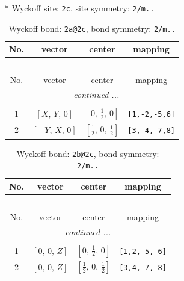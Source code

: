 \documentclass[fleqn,8pt]{jsarticle}
\begin{document}
* Wyckoff site: {\tt 2c}, site symmetry: {\tt 2/m..}
\renewcommand{\arraystretch}{1.2}
\begin{longtable}{cccc}
\caption{Wyckoff bond: {\tt 2a@2c}, bond symmetry: {\tt 2/m..}}
 \\
 \hline \hline
No. & vector & center & mapping \\ \hline \endfirsthead

\multicolumn{3}{l}{\tablename\ \thetable{}} \\
 \hline \hline
No. & vector & center & mapping \\ \hline \endhead

 \hline \hline
\multicolumn{3}{r}{\footnotesize\it continued ...} \\ \endfoot

 \hline \hline
\multicolumn{3}{r}{} \\ \endlastfoot

1 & $\left[ X,\, Y,\, 0 \right]$ & $\left[ 0,\, \frac{1}{2},\, 0 \right]$ & {\tt [1,-2,-5,6]} \\ \hline
2 & $\left[ - Y,\, X,\, 0 \right]$ & $\left[ \frac{1}{2},\, 0,\, \frac{1}{2} \right]$ & {\tt [3,-4,-7,8]} \\
\end{longtable}
\renewcommand{\arraystretch}{1.2}
\begin{longtable}{cccc}
\caption{Wyckoff bond: {\tt 2b@2c}, bond symmetry: {\tt 2/m..}}
 \\
 \hline \hline
No. & vector & center & mapping \\ \hline \endfirsthead

\multicolumn{3}{l}{\tablename\ \thetable{}} \\
 \hline \hline
No. & vector & center & mapping \\ \hline \endhead

 \hline \hline
\multicolumn{3}{r}{\footnotesize\it continued ...} \\ \endfoot

 \hline \hline
\multicolumn{3}{r}{} \\ \endlastfoot

1 & $\left[ 0,\, 0,\, Z \right]$ & $\left[ 0,\, \frac{1}{2},\, 0 \right]$ & {\tt [1,2,-5,-6]} \\ \hline
2 & $\left[ 0,\, 0,\, Z \right]$ & $\left[ \frac{1}{2},\, 0,\, \frac{1}{2} \right]$ & {\tt [3,4,-7,-8]} \\
\end{longtable}
\renewcommand{\arraystretch}{1.2}
\end{document}
